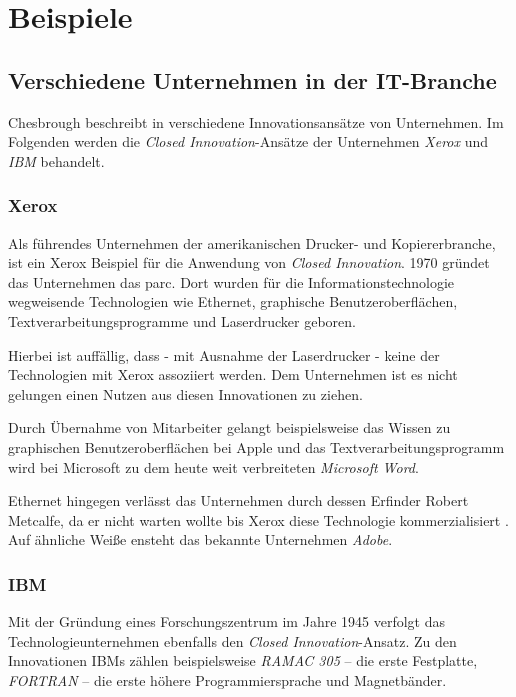 \section{Beispiele}\label{sec:beispiele}

\subsection{Verschiedene Unternehmen in der IT-Branche}\label{sec:beispiele-unternehmen}
Chesbrough beschreibt in \cite{chesbrough2003} verschiedene Innovationsansätze von Unternehmen.
Im Folgenden werden die \textit{Closed Innovation}-Ansätze der Unternehmen \textit{Xerox} und \textit{IBM} behandelt.

\subsubsection{Xerox \cite[1\psqq]{chesbrough2003}}
Als führendes Unternehmen der amerikanischen Drucker- und Kopiererbranche,
ist ein Xerox Beispiel für die Anwendung von \textit{Closed Innovation}.
1970 gründet das Unternehmen das \ac{parc}.
Dort wurden für die Informationstechnologie wegweisende Technologien wie
Ethernet, graphische Benutzeroberflächen, Textverarbeitungsprogramme und Laserdrucker geboren.

Hierbei ist auffällig, dass - mit Ausnahme der Laserdrucker - keine der Technologien mit Xerox
assoziiert werden.
Dem Unternehmen ist es nicht gelungen einen Nutzen aus diesen Innovationen zu ziehen.

Durch Übernahme von Mitarbeiter gelangt beispielsweise das Wissen zu graphischen Benutzeroberflächen bei Apple
und das Textverarbeitungsprogramm wird bei Microsoft zu dem heute weit verbreiteten \textit{Microsoft Word}.

Ethernet hingegen verlässt das Unternehmen durch dessen Erfinder Robert Metcalfe,
da er nicht warten wollte bis Xerox diese Technologie kommerzialisiert \cite[81]{chesbrough2003}.
Auf ähnliche Weiße ensteht das bekannte Unternehmen \textit{Adobe}.



\subsubsection{IBM \cite[93\psqq]{chesbrough2003}}
Mit der Gründung eines Forschungszentrum im Jahre 1945 verfolgt das Technologieunternehmen ebenfalls den \textit{Closed Innovation}-Ansatz.
Zu den Innovationen IBMs zählen beispielsweise
\textit{RAMAC 305} -- die erste Festplatte,
\textit{FORTRAN} -- die erste höhere Programmiersprache und
Magnetbänder.

